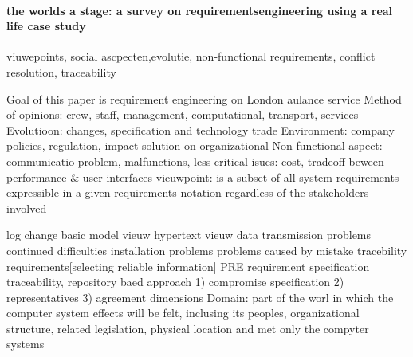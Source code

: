 \paragraph{the worlds a stage: a survey on requirementsengineering using a real life case study}
viuwepoints, social ascpecten,evolutie, non-functional requirements, conflict resolution, traceability

Goal of this paper is requirement  engineering on London aulance service
Method of opinions: crew, staff, management, computational, transport, services
Evolutioon: changes, specification and technology trade
Environment: company policies, regulation, impact solution on organizational
Non-functional aspect: communicatio problem, malfunctions, less critical isues: cost, tradeoff beween performance \& user interfaces
vieuwpoint: is a subset of all system requirements expressible in a given requirements notation regardless of the stakeholders involved

log change
basic model vieuw
hypertext vieuw
data transmission problems
continued difficulties
installation problems
problems caused by mistake
tracebility requirements[selecting reliable information]
PRE requirement specification traceability, repository baed approach
1) compromise specification
2) representatives
3) agreement dimensions
Domain: part of the worl in which the computer system effects will be felt, inclusing its peoples, organizational structure, related legislation, physical location and met only the compyter systems

%
%
%

